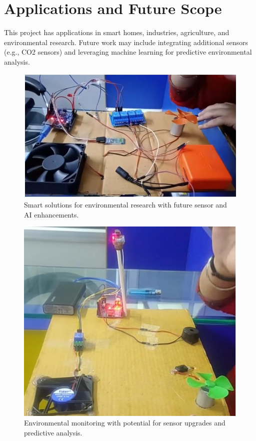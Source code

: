 \documentclass[12pt]{report}
\begin{document}
	\section*{Applications and Future Scope}
	This project has applications in smart homes, industries, agriculture, and environmental
	research. Future work may include integrating additional sensors (e.g., CO2 sensors) and
	leveraging machine learning for predictive environmental analysis.\\
	\begin{figure}[ht]
		\centering
		\includegraphics[scale=1.2]{futurescope01.jpg}
		\caption[smart_sol]{Smart solutions for environmental research with future sensor and AI enhancements.}
		\label{smart_sol}
	\end{figure}
	
	\begin{figure}[ht]
		\centering
		\includegraphics[scale=1.5]{futurescope02.jpg}
		\caption[monitoring]{Environmental monitoring with potential for sensor upgrades and predictive analysis.}
		\label{monitoring}
	\end{figure}
	
\end{document}
